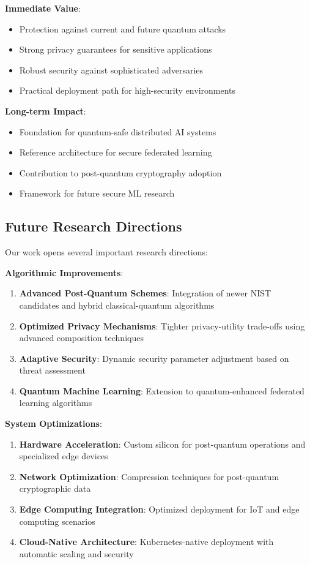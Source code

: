 \documentclass[onecolumn,11pt]{article}
\begin{document}
\textbf{Immediate Value}:
\begin{itemize}
\item Protection against current and future quantum attacks
\item Strong privacy guarantees for sensitive applications
\item Robust security against sophisticated adversaries
\item Practical deployment path for high-security environments
\end{itemize}

\textbf{Long-term Impact}:
\begin{itemize}
\item Foundation for quantum-safe distributed AI systems
\item Reference architecture for secure federated learning
\item Contribution to post-quantum cryptography adoption
\item Framework for future secure ML research
\end{itemize}

\subsection{Future Research Directions}

Our work opens several important research directions:

\textbf{Algorithmic Improvements}:
\begin{enumerate}
\item \textbf{Advanced Post-Quantum Schemes}: Integration of newer NIST candidates and hybrid classical-quantum algorithms
\item \textbf{Optimized Privacy Mechanisms}: Tighter privacy-utility trade-offs using advanced composition techniques
\item \textbf{Adaptive Security}: Dynamic security parameter adjustment based on threat assessment
\item \textbf{Quantum Machine Learning}: Extension to quantum-enhanced federated learning algorithms
\end{enumerate}

\textbf{System Optimizations}:
\begin{enumerate}
\item \textbf{Hardware Acceleration}: Custom silicon for post-quantum operations and specialized edge devices
\item \textbf{Network Optimization}: Compression techniques for post-quantum cryptographic data
\item \textbf{Edge Computing Integration}: Optimized deployment for IoT and edge computing scenarios
\item \textbf{Cloud-Native Architecture}: Kubernetes-native deployment with automatic scaling and security
\end{enumerate}
\end{document}
